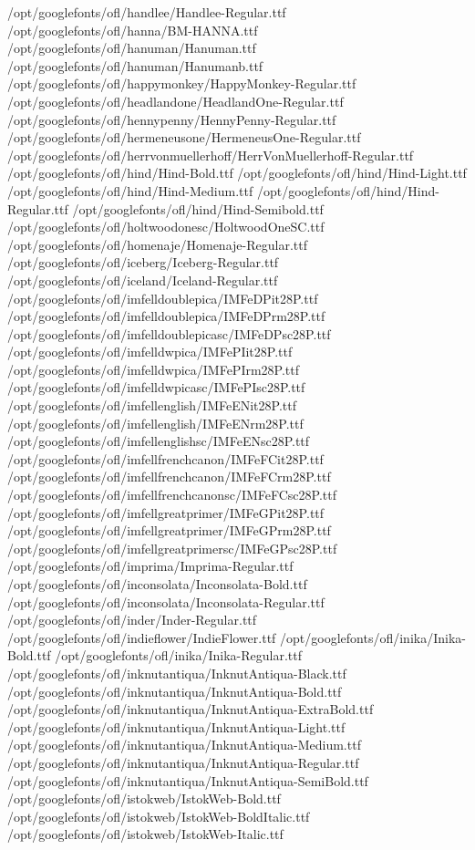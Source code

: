 /opt/googlefonts/ofl/handlee/Handlee-Regular.ttf
/opt/googlefonts/ofl/hanna/BM-HANNA.ttf
/opt/googlefonts/ofl/hanuman/Hanuman.ttf
/opt/googlefonts/ofl/hanuman/Hanumanb.ttf
/opt/googlefonts/ofl/happymonkey/HappyMonkey-Regular.ttf
/opt/googlefonts/ofl/headlandone/HeadlandOne-Regular.ttf
/opt/googlefonts/ofl/hennypenny/HennyPenny-Regular.ttf
/opt/googlefonts/ofl/hermeneusone/HermeneusOne-Regular.ttf
/opt/googlefonts/ofl/herrvonmuellerhoff/HerrVonMuellerhoff-Regular.ttf
/opt/googlefonts/ofl/hind/Hind-Bold.ttf
/opt/googlefonts/ofl/hind/Hind-Light.ttf
/opt/googlefonts/ofl/hind/Hind-Medium.ttf
/opt/googlefonts/ofl/hind/Hind-Regular.ttf
/opt/googlefonts/ofl/hind/Hind-Semibold.ttf
/opt/googlefonts/ofl/holtwoodonesc/HoltwoodOneSC.ttf
/opt/googlefonts/ofl/homenaje/Homenaje-Regular.ttf
/opt/googlefonts/ofl/iceberg/Iceberg-Regular.ttf
/opt/googlefonts/ofl/iceland/Iceland-Regular.ttf
/opt/googlefonts/ofl/imfelldoublepica/IMFeDPit28P.ttf
/opt/googlefonts/ofl/imfelldoublepica/IMFeDPrm28P.ttf
/opt/googlefonts/ofl/imfelldoublepicasc/IMFeDPsc28P.ttf
/opt/googlefonts/ofl/imfelldwpica/IMFePIit28P.ttf
/opt/googlefonts/ofl/imfelldwpica/IMFePIrm28P.ttf
/opt/googlefonts/ofl/imfelldwpicasc/IMFePIsc28P.ttf
/opt/googlefonts/ofl/imfellenglish/IMFeENit28P.ttf
/opt/googlefonts/ofl/imfellenglish/IMFeENrm28P.ttf
/opt/googlefonts/ofl/imfellenglishsc/IMFeENsc28P.ttf
/opt/googlefonts/ofl/imfellfrenchcanon/IMFeFCit28P.ttf
/opt/googlefonts/ofl/imfellfrenchcanon/IMFeFCrm28P.ttf
/opt/googlefonts/ofl/imfellfrenchcanonsc/IMFeFCsc28P.ttf
/opt/googlefonts/ofl/imfellgreatprimer/IMFeGPit28P.ttf
/opt/googlefonts/ofl/imfellgreatprimer/IMFeGPrm28P.ttf
/opt/googlefonts/ofl/imfellgreatprimersc/IMFeGPsc28P.ttf
/opt/googlefonts/ofl/imprima/Imprima-Regular.ttf
/opt/googlefonts/ofl/inconsolata/Inconsolata-Bold.ttf
/opt/googlefonts/ofl/inconsolata/Inconsolata-Regular.ttf
/opt/googlefonts/ofl/inder/Inder-Regular.ttf
/opt/googlefonts/ofl/indieflower/IndieFlower.ttf
/opt/googlefonts/ofl/inika/Inika-Bold.ttf
/opt/googlefonts/ofl/inika/Inika-Regular.ttf
/opt/googlefonts/ofl/inknutantiqua/InknutAntiqua-Black.ttf
/opt/googlefonts/ofl/inknutantiqua/InknutAntiqua-Bold.ttf
/opt/googlefonts/ofl/inknutantiqua/InknutAntiqua-ExtraBold.ttf
/opt/googlefonts/ofl/inknutantiqua/InknutAntiqua-Light.ttf
/opt/googlefonts/ofl/inknutantiqua/InknutAntiqua-Medium.ttf
/opt/googlefonts/ofl/inknutantiqua/InknutAntiqua-Regular.ttf
/opt/googlefonts/ofl/inknutantiqua/InknutAntiqua-SemiBold.ttf
/opt/googlefonts/ofl/istokweb/IstokWeb-Bold.ttf
/opt/googlefonts/ofl/istokweb/IstokWeb-BoldItalic.ttf
/opt/googlefonts/ofl/istokweb/IstokWeb-Italic.ttf
